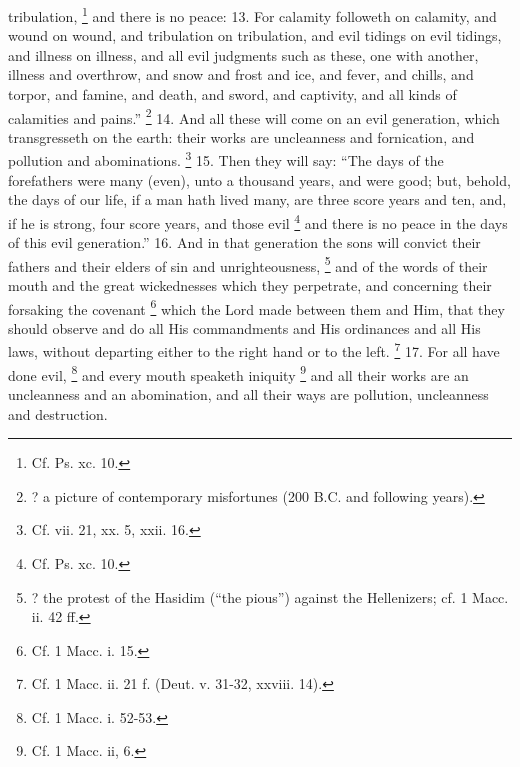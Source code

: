 tribulation, \footnote{Cf. Ps. xc. 10.} and there is no peace: 13. For calamity followeth on calamity, and wound on wound, and tribulation on tribulation, and evil tidings on evil tidings, and illness on illness, and all evil judgments such as these, one with another, illness and overthrow, and snow and frost and ice, and fever, and chills, and torpor, and famine, and death, and sword, and captivity, and all kinds of calamities and pains.'' \footnote{? a picture of contemporary misfortunes (200 B.C. and following years).} 14. And all these will come on an evil generation, which transgresseth on the earth: their works are uncleanness and fornication, and pollution and abominations. \footnote{Cf. vii. 21, xx. 5, xxii. 16.} 15. Then they will say: ``The days of the forefathers were many (even), unto a thousand years, and were good; but, behold, the days of our life, if a man hath lived many, are three score years and ten, and, if he is strong, four score years, and those evil \footnote{Cf. Ps. xc. 10.} and there is no peace in the days of this evil generation.'' 16. And in that generation the sons will convict their fathers and their elders of sin and unrighteousness, \footnote{? the protest of the Hasidim (``the pious'') against the Hellenizers; cf. 1 Macc. ii. 42 ff.} and of the words of their mouth and the great wickednesses which they perpetrate, and concerning their forsaking the covenant \footnote{Cf. 1 Macc. i. 15.} which the Lord made between them and Him, that they should observe and do all His commandments and His ordinances and all His laws, without departing either to the right hand or to the left. \footnote{Cf. 1 Macc. ii. 21 f. (Deut. v. 31-32, xxviii. 14).} 17. For all have done evil, \footnote{Cf. 1 Macc. i. 52-53.} and every mouth speaketh iniquity \footnote{Cf. 1 Macc. ii, 6.} and all their works are an uncleanness and an abomination, and all their ways are pollution, uncleanness and destruction.


